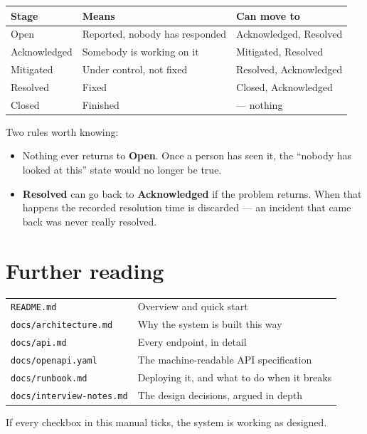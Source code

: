 \documentclass[11pt,a4paper]{article}
\begin{document}
\begin{center}
\begin{tabular}{@{}lll@{}}
\toprule
\textbf{Stage} & \textbf{Means} & \textbf{Can move to} \\
\midrule
Open         & Reported, nobody has responded  & Acknowledged, Resolved \\
Acknowledged & Somebody is working on it       & Mitigated, Resolved \\
Mitigated    & Under control, not fixed        & Resolved, Acknowledged \\
Resolved     & Fixed                           & Closed, Acknowledged \\
Closed       & Finished                        & --- nothing \\
\bottomrule
\end{tabular}
\end{center}

Two rules worth knowing:

\begin{itemize}[leftmargin=1.2cm,itemsep=3pt]
\item Nothing ever returns to \textbf{Open}. Once a person has seen it, the
  ``nobody has looked at this'' state would no longer be true.
\item \textbf{Resolved} can go back to \textbf{Acknowledged} if the problem
  returns. When that happens the recorded resolution time is discarded --- an
  incident that came back was never really resolved.
\end{itemize}

\section{Further reading}

\begin{center}
\begin{tabular}{@{}>{\raggedright\arraybackslash}p{5.4cm}>{\raggedright\arraybackslash}p{9.6cm}@{}}
\toprule
\texttt{README.md} & Overview and quick start \\
\texttt{docs/architecture.md} & Why the system is built this way \\
\texttt{docs/api.md} & Every endpoint, in detail \\
\texttt{docs/openapi.yaml} & The machine-readable API specification \\
\texttt{docs/runbook.md} & Deploying it, and what to do when it breaks \\
\texttt{docs/interview-notes.md} & The design decisions, argued in depth \\
\bottomrule
\end{tabular}
\end{center}

\vfill
\begin{center}
\color{muted}\small
If every checkbox in this manual ticks, the system is working as designed.
\end{center}
\end{document}
